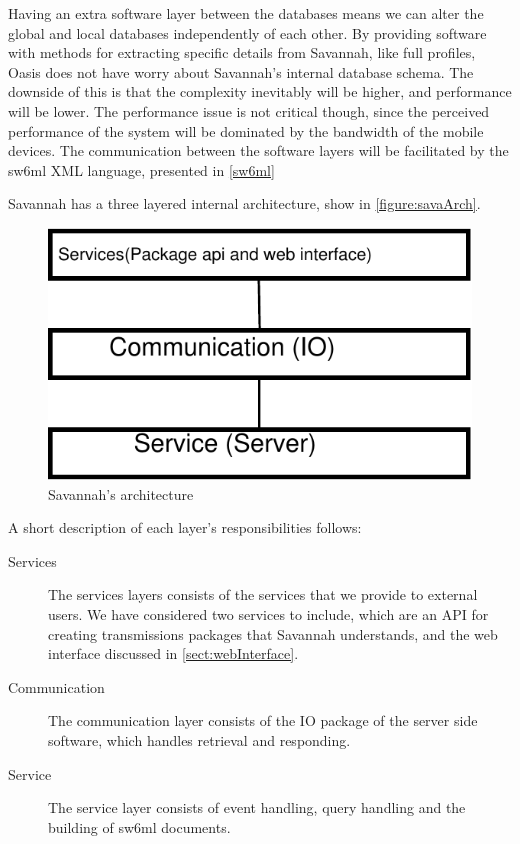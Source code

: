 Having an extra software layer between the databases means we can alter the global and local databases independently of each other. By providing software with methods for extracting specific
details from Savannah, like full profiles, Oasis does not have worry about Savannah's internal database schema. The downside of this is that the complexity inevitably will be higher, and performance
will be lower. The performance issue is not critical though, since the perceived performance of the system will be dominated by the bandwidth of the mobile devices. 
The communication between the software layers will be facilitated by the sw6ml XML language, presented in \autoref{sw6ml}

Savannah has a three layered internal architecture, show in \autoref{figure:savaArch}.

\begin{figure}[H]
  \centering
    \includegraphics{images/savaArch}
  \caption{Savannah's architecture}
  \label{figure:savaArch}
\end{figure}

A short description of each layer's responsibilities follows:

\begin{description}
 \item[Services] The services layers consists of the services that we provide to external users. We have considered two services to include, which are an API for creating transmissions packages	 		that Savannah understands, and the web interface discussed in \autoref{sect:webInterface}.
 \item[Communication] The communication layer consists of the IO package of the server side software, which handles retrieval and responding.
 \item[Service] The service layer consists of event handling, query handling and the building of sw6ml documents.
\end{description}


